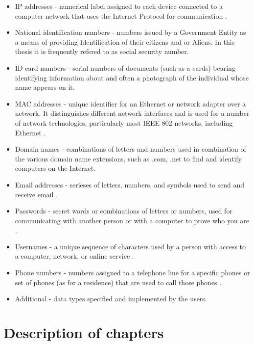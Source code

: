 \documentclass[a4paper,twoside,12pt]{book}
\begin{document}
\begin{itemize}
   \item IP addresses - numerical label assigned to each device connected to a computer network that uses the Internet Protocol for communication \cite{bib:articleIP}.
   \item National identification numbers - numbers issued by a Government Entity as a means of providing Identification of their citizens and or Aliens\cite{bib:internetIdentityNumber}.
   In this thesis it is frequently refered to as social security number.
   \item ID card numbers - serial numbers of documents (such as a cards) bearing identifying information about and often a photograph of the individual whose 
   name appears on it\cite{bib:internetID}. 
   \item MAC addresses - unique identifier for an Ethernet or network adapter over a network. It distinguishes different network interfaces and is used for a number 
   of network technologies, particularly most IEEE 802 networks, including Ethernet \cite{bib:internetMAC}.
   \item Domain names - combinations of letters and numbers used in combination of the various domain name extensions, such as .com, .net to find and 
   identify computers on the Internet\cite{bib:internetDomain}.
   \item Email addresses - serieses of letters, numbers, and symbols used to send and receive email \cite{bib:internetEmail}.
   \item Passwords - secret words or combinations of letters or numbers, used for communicating with another person or with a computer to prove who you are \cite{bib:internetPassword}.
   \item Usernames - a unique sequence of characters used by a person with access to a computer, network, or online service \cite{bib:internetUsername}.
   \item Phone numbers - numbers assigned to a telephone line for a specific phones or set of phones (as for a residence) that are used to call those phones \cite{bib:internetPhone}.
   \item Additional - data types specified and implemented by the users.
\end{itemize}


\section{Description of chapters}
\end{document}
